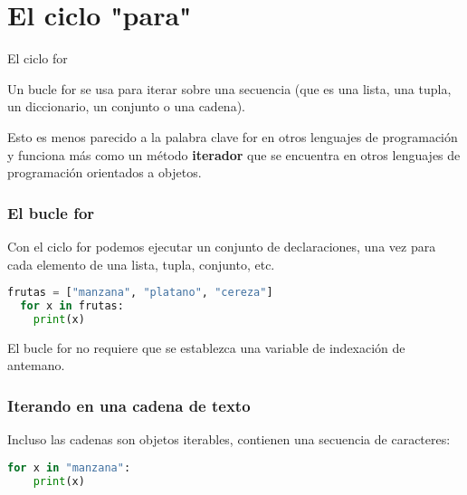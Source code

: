 \section{El ciclo "para"}

\begin{frame}[c]{El ciclo for}

  Un bucle \textcolor{codeKeyword}{for} se usa para iterar sobre una secuencia
  (que es una lista, una tupla, un diccionario, un conjunto o una cadena).

  \vspace{\baselineskip}
  Esto es menos parecido a la palabra clave \textcolor{codeKeyword}{for} en
  otros lenguajes de programación y funciona más como un método
  \textbf{iterador} que se encuentra en otros lenguajes de programación
  orientados a objetos.
\end{frame}

\begin{frame}[fragile]
  \frametitle{El bucle for}

  Con el ciclo for podemos ejecutar un conjunto de declaraciones,
  una vez para cada elemento de una lista, tupla, conjunto, etc.

  \vspace{\baselineskip}
  \begin{lstlisting}[language=Python]
  frutas = ["manzana", "platano", "cereza"]
  for x in frutas:
    print(x)
  \end{lstlisting}

  \vspace{\baselineskip}
  El bucle for no requiere que se establezca una variable de
  indexación de antemano.
\end{frame}

\begin{frame}[fragile]
  \frametitle{Iterando en una cadena de texto}

  Incluso las cadenas son objetos iterables, contienen una
  secuencia de caracteres:

  \vspace{\baselineskip}
  \begin{lstlisting}[language=Python]
  for x in "manzana":
    print(x)
  \end{lstlisting}
\end{frame}

